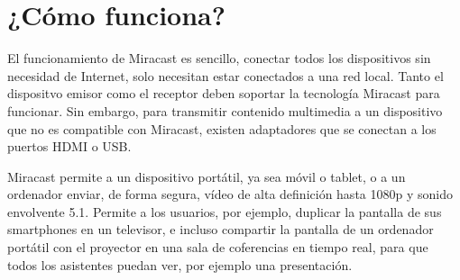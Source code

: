 \section{¿Cómo funciona?}

El funcionamiento de Miracast es sencillo, conectar todos los dispositivos sin necesidad de Internet, solo necesitan estar conectados a una red local. Tanto el dispositvo emisor como el receptor deben soportar la tecnología Miracast para funcionar. Sin embargo, para transmitir contenido multimedia a un dispositivo que no es compatible con Miracast, existen adaptadores que se conectan a los puertos HDMI o USB.

Miracast permite a un dispositivo portátil, ya sea móvil o tablet, o a un ordenador enviar, de forma segura, vídeo de alta definición hasta 1080p y sonido envolvente 5.1. Permite a los usuarios, por ejemplo, duplicar la pantalla de sus smartphones en un televisor, e incluso compartir la pantalla de un ordenador portátil con el proyector en una sala de coferencias en tiempo real, para que todos los asistentes puedan ver, por ejemplo una presentación.
